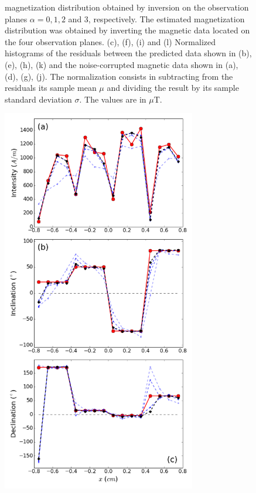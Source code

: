 \documentclass[draft,gc]{agutex}
\begin{document}
\begin{figure}
{ magnetization distribution obtained by inversion on the
 observation planes $\alpha = 0, 1, 2$ and $3$, respectively.
 The estimated magnetization distribution was obtained by
 inverting the magnetic data located on the four observation
 planes.
 (c), (f), (i) and (l) Normalized histograms of the residuals between the
 predicted data shown in (b), (e), (h), (k) and the 
 noise-corrupted magnetic data shown in (a), (d), (g), (j). 
 The normalization
 consists in subtracting from the residuals its sample mean $\mu$ 
 and dividing the result by its sample standard deviation $\sigma$.
 The values are in $\mu$T.}
 \label{fig:datafit-pre-processing}
 \end{figure}
 
 \begin{figure}
 \noindent \includegraphics[width=20pc]{Figs/Fig8_LQ.png}

\end{figure}
\end{document}
